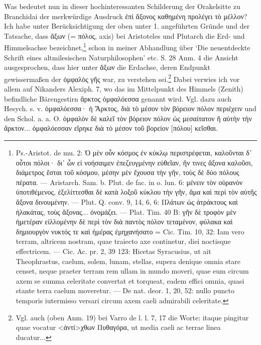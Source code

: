 \documentclass[a4paper, 11pt, oneside]{article}
\begin{document}
Was bedeutet nun in dieser hochinteressanten Schilderung der Orakelsitte zu Branchidai der merkwürdige Ausdruck ἐπὶ ἄξονος καθημένη προλέγει τὸ μέλλον? Ich habe unter Berücksichtigung der oben unter 1. angeführten Gründe und der Tatsache, dass ἄξων (= πόλος, axis) bei Aristoteles und Plutarch die Erd- und Himmelsachse bezeichnet,\footnote{Ps.-Aristot. de mu. 2: Ὁ μὲν οὖν κόσμος ἐν κύκλῳ περιστρέφεται, καλοῦνται δ᾽ οὗτοι πόλοι· δι᾽ ὧν εἰ νοήσαιμεν ἐπεζευγμένην εὐθεῖαν, ἥν τινες ἄξονα καλοῦσι, διάμετρος ἔσται τοῦ κόσμου, μέσην μὲν ἔχουσα τὴν γῆν, τοὺς δὲ δύο πόλους πέρατα. --- Aristarch. Sam. b. Plut. de fac. in o. lun. 6: μένειν τὸν οὐρανὸν ὑποτιθέμενος, ἐξελίττεσθαι δὲ κατὰ λοξοῦ κύκλου τὴν γῆν, ἅμα καὶ περὶ τὸν αὑτῆς ἄξονα δινουμένην. --- Plut. Q. conv. 9, 14, 6, 6: Πλάτων ὡς ἀτράκτους καὶ ἠλακάτας, τοὺς ἄξονας... ὀνομάζει. --- Plat. Tim. 40 B: γῆν δὲ τροφὸν μὲν ἡμετέραν εἰλλομένην δὲ περὶ τὸν διὰ παντὸς πόλον τεταμένον, φύλακα καὶ δημιουργὸν νυκτός τε καὶ ἡμέρας ἐμηχανήσατο = Cic. Tim. 10, 32: Iam vero terram, altricem nostram, quae traiecto axe continetur, diei noctisque effectricem. --- Cic. Ac. pr. 2, 39 123: Hicetas Syracusius, ut ait Theophrastus, caelum, solem, lunam, stellas, supera denique omnia stare censet, neque praeter terram rem ullam in mundo moveri, quae eum circum axem se summa celeritate convertat et torqueat, eadem effici omnia, quasi stante terra caelum moveretur. --- De nat. deor. 1, 20, 52: nullo puncto temporis iutermisso versari circum axem caeli admirabili celeritate.} schon in meiner Abhandlung über `Die neuentdeckte Schrift eines altmilesischen Naturphilosophen' etc. S. 28 Anm. 4 die Ansicht ausgesprochen, dass hier unter ἄξων die Erdachse, deren Endpunkt gewissermaßen der ὀμφαλὸς γῆς war, zu verstehen sei.\footnote{Vgl. auch (oben Anm. 19) bei Varro de l. l. 7, 17 die Worte: itaque pingitur quae vocatur <ἀντί>χθων Πυθαγόρα, ut media caeli ac terrae linea ducatur...} Dabei verwies ich vor allem auf Nikanders Alexiph. 7, wo das im Mittelpunkt des Himmels (Zenith) befindliche Bärengestirn ἄρκτος ὀμφαλόεσσα genannt wird. Vgl. dazu auch Hesych. s. v. ὀμφαλόεσσα· ἡ Ἄρκτος, διὰ τὸ μέσον τὸν βόρειον πόλον περιέχειν und den Schol. a. a. O. ὀμφαλὸν δὲ καλεῖ τὸν βόρειον πόλον ὡς μεσαίτατον ἢ αὐτὴν τὴν ἄρκτον... ὁμφαλόεσσαν εἴρηκε διὰ τὸ μέσον τοῦ βορείον [πόλου] κεῖσθαι.
\end{document}

